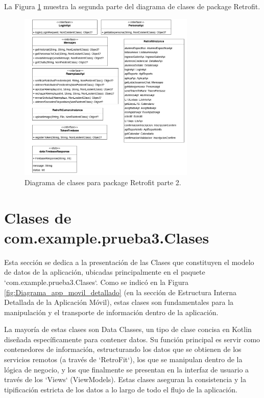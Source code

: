 La Figura \ref{fig:Retrofit2} muestra la segunda parte del diagrama de clases de package Retrofit.

\begin{figure}[htbp!]
	\begin{center}
		\includegraphics[width=0.75\textwidth]{DiagramasMoviles/DCM (11)}
		\caption{Diagrama de clases para package Retrofit parte 2.}
		\label{fig:Retrofit2}
	\end{center}
\end{figure}

\newpage

\section{Clases de com.example.prueba3.Clases}

Esta sección se dedica a la presentación de las Clases que constituyen el modelo de datos de la aplicación, ubicadas principalmente en el paquete `com.example.prueba3.Clases`. Como se indicó en la Figura \ref{fig:Diagrama_app_movil_detallado} (en la sección de Estructura Interna Detallada de la Aplicación Móvil), estas clases son fundamentales para la manipulación y el transporte de información dentro de la aplicación.

La mayoría de estas clases son Data Classes, un tipo de clase concisa en Kotlin diseñada específicamente para contener datos. Su función principal es servir como contenedores de información, estructurando los datos que se obtienen de los servicios remotos (a través de `RetroFit`), los que se manipulan dentro de la lógica de negocio, y los que finalmente se presentan en la interfaz de usuario a través de los `Views` (ViewModels). Estas clases aseguran la consistencia y la tipificación estricta de los datos a lo largo de todo el flujo de la aplicación.

